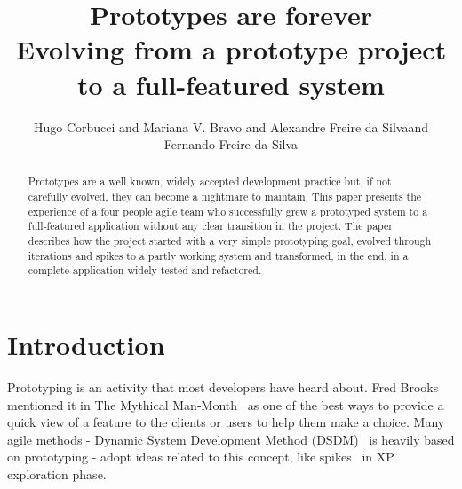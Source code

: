 \documentclass[lnbip]{svmultln}
\begin{document}
%
\mainmatter %
%
\title{Prototypes are forever\\
  Evolving from a prototype project\\ to a full-featured system}
%
%
\author{Hugo Corbucci and Mariana V. Bravo  and
  Alexandre Freire da Silvaand Fernando Freire da
  Silva}
%
%
%

\maketitle %

\begin{abstract} %
  Prototypes are a well known, widely accepted development practice
  but, if not carefully evolved, they can become a nightmare to
  maintain. This paper presents the experience of a four people agile
  team who successfully grew a prototyped system to a full-featured
  application without any clear transition in the project. The paper
  describes how the project started with a very simple prototyping
  goal, evolved through iterations and spikes to a partly working
  system and transformed, in the end, in a complete application widely
  tested and refactored.

\end{abstract}
%
\section{Introduction}

Prototyping is an activity that most developers have heard about. Fred
Brooks mentioned it in The Mythical Man-Month~\cite{Brooks1975} as one
of the best ways to provide a quick view of a feature to the clients
or users to help them make a choice. Many agile methods - Dynamic
System Development Method (DSDM)~\cite{DSDM} is heavily based on
prototyping - adopt ideas related to this concept, like
spikes~\cite{XP} in XP exploration phase.
\end{document}
